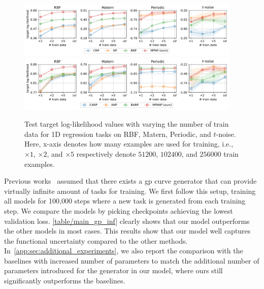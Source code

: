 % 


\begin{figure}[t]
    \centering
    \includegraphics[width=0.95\textwidth]{figure/main_gp_finite_np.pdf}
    \includegraphics[width=0.95\textwidth]{figure/main_gp_finite_anp.pdf}
    \caption{Test target log-likelihood values with varying the number of train data for 1D regression tasks on RBF, Matern, Periodic, and $t$-noise. Here, x-axis denotes how many examples are used for training, i.e., $\times1$, $\times2$, and $\times5$ respectively denote $51200$, $102400$, and $256000$ train examples.}
    \label{figure/main_gp_finite}
\end{figure}

Previous works~\citep{garnelo2018neural,kim2018attentive,le2018empirical} assumed that there exists a \gls{gp} curve generator that can provide virtually infinite amount of tasks for training. We first follow this setup, training all models for 100,000 steps where a new task is generated from each training step. We compare the models by picking checkpoints achieving the lowest validation loss. \cref{table/main_gp_inf} clearly shows that our model outperforms the other models in most cases. This results show that our model well captures the functional uncertainty compared to the other methods.
In~\cref{app:sec:additional_experiments}, we also report the comparison with the baselines with increased number of parameters to match the additional number of parameters introduced for the generator in our model, where ours still significantly outperforms the baselines.

